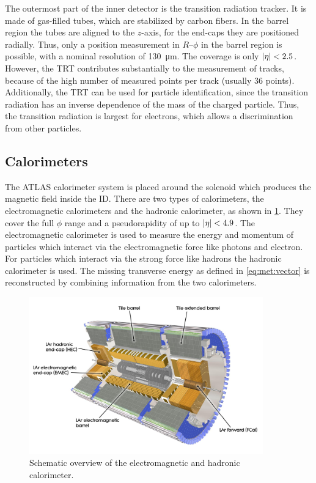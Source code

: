 The outermost part of the inner detector is the transition radiation tracker.
It is made of gas-filled tubes, which are stabilized by carbon fibers.
In the barrel region the tubes are aligned to the $z$-axis, for the end-caps they are positioned radially.
Thus, only a position measurement in $R$\nobreakdash--$\phi$ in the barrel region is possible, with a
nominal resolution of \SI{130}{\um}.
The coverage is only $\left|\eta\right| < 2.5$.
However, the TRT contributes substantially to the measurement of tracks, because of the high number of
measured points per track (usually 36 points).
Additionally, the TRT can be used for particle identification, since the transition radiation has
an inverse dependence of the mass of the charged particle.
Thus, the transition radiation is largest for electrons, which allows a discrimination from other particles.


\subsection{Calorimeters}\label{sub:setup:calorimeters}

The ATLAS calorimeter system is placed around the solenoid which produces the magnetic field inside the ID\@.
There are two types of calorimeters, the electromagnetic calorimeters and the hadronic calorimeter,
as shown in \cref{fig:setup:calo}.
They cover the full $\phi$ range and a pseudorapidity of up to $\left|\eta\right| < 4.9$.
The electromagnetic calorimeter is used to measure the energy and momentum of particles which interact via the electromagnetic force like photons and
electron.
For particles which interact via the strong force like hadrons the hadronic calorimeter is used.
The missing transverse energy as defined in \cref{eq:met:vector} is reconstructed by combining information from the two
calorimeters.

\begin{figure}[htb]
    \centering
    \includegraphics[width=0.9\textwidth]{./figures/setup/calorimeters.jpg}
    \caption{Schematic overview of the electromagnetic and hadronic calorimeter.~\cite{ImageCalo}}\label{fig:setup:calo}
\end{figure}

